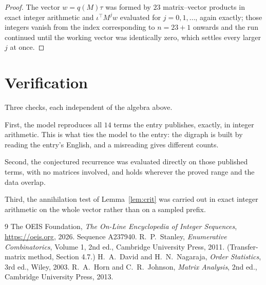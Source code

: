 \documentclass[11pt,a4paper]{article}
\theoremstyle{plain}
\theoremstyle{definition}
\begin{document}
\begin{proof}
The vector $w=q(M)\tau$ was formed by $23$ matrix--vector products in exact integer
arithmetic and $\iota^{\!\top}M^{j}w$ evaluated for $j=0,1,\dots$, again exactly; those
integers vanish from the index corresponding to $n=23+1$ onwards and the run continued
until the working vector was identically zero, which settles every larger $j$ at once.
\end{proof}

\section{Verification}

Three checks, each independent of the algebra above.

First, the model reproduces all $14$ terms the entry publishes, exactly, in integer
arithmetic. This is what ties the model to the entry: the digraph is built by reading the
entry's English, and a misreading gives different counts.

Second, the conjectured recurrence was evaluated directly on those published terms, with no
matrices involved, and holds wherever the proved range and the data overlap.

Third, the annihilation test of Lemma~\ref{lem:crit} was carried out in exact integer
arithmetic on the whole vector rather than on a sampled prefix.

\begin{thebibliography}{9}
 The OEIS Foundation, \emph{The On-Line Encyclopedia of Integer
Sequences}, \url{https://oeis.org}, 2026. Sequence A237940.
 R.~P.~Stanley, \emph{Enumerative Combinatorics}, Volume 1, 2nd ed.,
Cambridge University Press, 2011. (Transfer-matrix method, Section 4.7.)
 H.~A.~David and H.~N.~Nagaraja, \emph{Order Statistics}, 3rd ed., Wiley,
2003.
 R.~A.~Horn and C.~R.~Johnson, \emph{Matrix Analysis}, 2nd ed., Cambridge
University Press, 2013.
\end{thebibliography}
\end{document}
